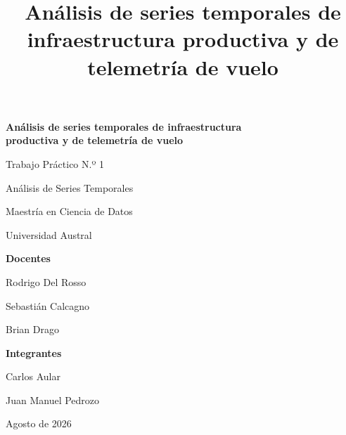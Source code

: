 \documentclass[doc,11pt,donotrepeattitle]{apa7}
\title{Análisis de series temporales de infraestructura productiva y de telemetría de vuelo}
\author{}
\affiliation{}
\begin{document}
\thispagestyle{empty}
\begin{center}
\vspace*{3.5cm}

{\Large\bfseries Análisis de series temporales de infraestructura\\[0.3em]
productiva y de telemetría de vuelo\par}

\vspace{1.2cm}
{\large Trabajo Práctico N.º 1\par}

\vspace{2.5cm}
{\large Análisis de Series Temporales\par}
\vspace{0.4em}
{\large Maestría en Ciencia de Datos\par}
\vspace{0.4em}
{\large Universidad Austral\par}

\vspace{2.5cm}
\textbf{Docentes}\par
\vspace{0.4em}
Rodrigo Del Rosso\par
Sebastián Calcagno\par
Brian Drago\par

\vspace{2.5cm}
\textbf{Integrantes}\par
\vspace{0.4em}
Carlos Aular\par
\vspace{0.3em}
Juan Manuel Pedrozo\par

\vfill
Agosto de 2026
\end{center}
\newpage
\setcounter{page}{1}



\newpage
\tableofcontents
\newpage
\listoffigures
\listoftables
\newpage






\end{document}
